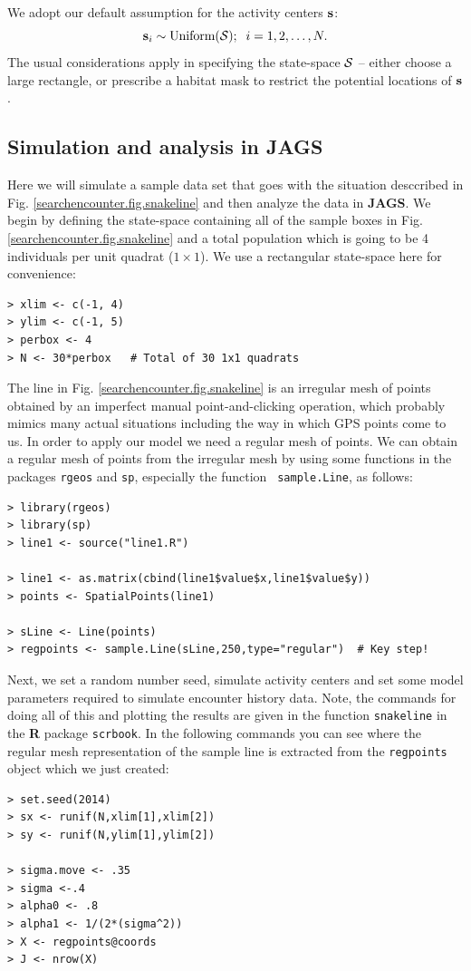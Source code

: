 We adopt our default assumption for the activity centers ${\bf s}$:
\[
 {\bf s}_{i} \sim \mbox{Uniform}({\cal S}); \; \; i=1,2,\ldots,N.
\]
The usual considerations apply in specifying the state-space ${\cal
  S}$ -- either choose a large rectangle, or prescribe a habitat mask
to restrict the potential locations of ${\bf s}$.



\subsection{Simulation and analysis in {\bf JAGS}}

Here we will simulate a sample data set that goes with the situation
desccribed in Fig. \ref{searchencounter.fig.snakeline} and then
analyze the data in {\bf JAGS}.  We begin by defining the state-space
containing all of the sample boxes in
Fig. \ref{searchencounter.fig.snakeline} and a total population which
is going to be 4 individuals per unit quadrat ($1 \times 1$). We use a
rectangular state-space here for convenience:
\begin{verbatim}
> xlim <- c(-1, 4)
> ylim <- c(-1, 5)
> perbox <- 4
> N <- 30*perbox   # Total of 30 1x1 quadrats
\end{verbatim}
The line in Fig. \ref{searchencounter.fig.snakeline} is an irregular
mesh of points obtained by an imperfect manual point-and-clicking
operation, which probably mimics many actual situations including the
way in which GPS points come to us. In order to apply our model we
need a regular mesh of points. We can obtain a regular mesh of points
from the irregular mesh by using some functions in the packages
\mbox{\tt rgeos} and \mbox{\tt sp}, especially the function \mbox{\tt
  sample.Line}, as follows:
\begin{verbatim}
> library(rgeos)
> library(sp)
> line1 <- source("line1.R")

> line1 <- as.matrix(cbind(line1$value$x,line1$value$y))
> points <- SpatialPoints(line1)

> sLine <- Line(points)
> regpoints <- sample.Line(sLine,250,type="regular")  # Key step!
\end{verbatim}
Next, we set a random number seed, simulate activity centers and set
some model parameters required to simulate encounter history data.
Note, the commands for doing all of this and plotting the results are given
in the function \mbox{\tt snakeline} in the {\bf R} package
\mbox{\tt scrbook}. 
In the following commands you can see where the
regular mesh representation of the sample line is extracted from the
\mbox{\tt regpoints} object which we just created:
{\small
\begin{verbatim}
> set.seed(2014)
> sx <- runif(N,xlim[1],xlim[2])
> sy <- runif(N,ylim[1],ylim[2])

> sigma.move <- .35
> sigma <-.4
> alpha0 <- .8
> alpha1 <- 1/(2*(sigma^2))
> X <- regpoints@coords
> J <- nrow(X)
\end{verbatim}
}

